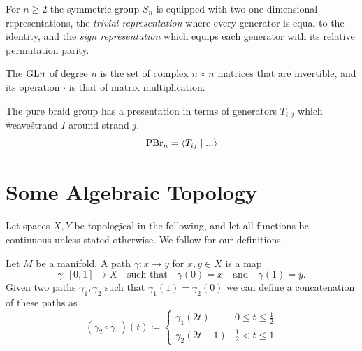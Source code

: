 \begin{definition}
    For $n \geq 2$ the symmetric group $S_n$ is equipped with two
    one-dimensional representations, the \emph{trivial representation} where
    every generator is equal to the identity, and the \emph{sign representation}
    which equips each generator with its relative permutation parity.
\end{definition}

\begin{definition}
    The \emph{} $\mathrm{GL}{n}$ of degree $n$ is the set of
     complex $n\times n$ matrices that are
    invertible, and its operation $\cdot$ is that of matrix multiplication. 
\end{definition}

\begin{definition}
  The pure braid group has a presentation in terms of generators $T_{i,j}$ which \"weave\" strand $I$ around strand $j$.
  \[
    \mathrm{PBr}_n = \left\langle T_{ij} \mid ... \right\rangle
  \]
\end{definition}



\section{Some Algebraic Topology}
\label{app_gen:homotopy}

Let spaces $X,Y$ be topological in the following, and let all functions be
continuous unless stated otherwise. We follow \textcite[~Chapitre
III]{bourbakiTopologieAlgebrique2016} for our definitions.

\begin{definition}
    Let $M$ be a manifold. A path $\gamma : x \to y$ for $x,y \in X$ is a map
    \[
        \gamma : [0,1] \to X \quad \text{such that}\quad \gamma(0) = x \quad \text{and}\quad \gamma(1) = y.
    \]
    Given two paths $\gamma_1,\gamma_2$ such that $\gamma_1(1) = \gamma_2(0)$ we can define a concatenation of these paths as
    \begin{equation}\label{app:top:pathConcatenation}
        (\gamma_2 \circ \gamma_1)(t) \coloneqq \begin{cases}
            \gamma_1(2t) & 0 \leq t \leq \frac{1}{2} \\
            \gamma_2(2t - 1) & \frac{1}{2} < t \leq 1
        \end{cases}
    \end{equation}

\end{definition}


